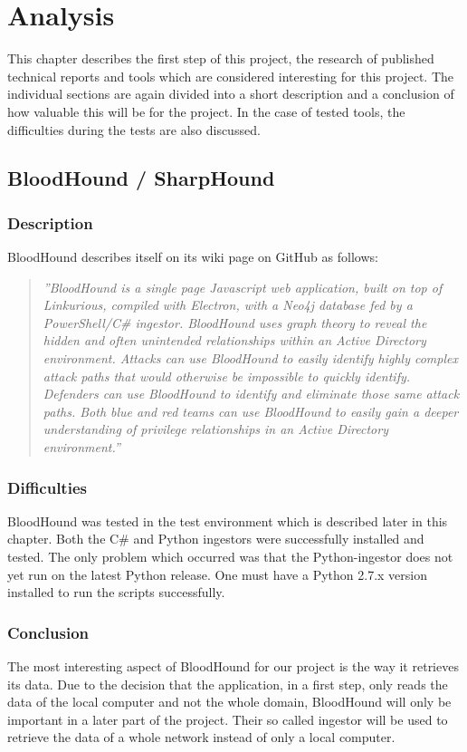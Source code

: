 \section{Analysis}
This chapter describes the first step of this project, the research of published technical reports and tools which are considered interesting for this project. The individual sections are again divided into a short description and a conclusion of how valuable this will be for the project. In the case of tested tools, the difficulties during the tests are also discussed.
\subsection{BloodHound / SharpHound}
\subsubsection{Description}
BloodHound describes itself on its wiki page on GitHub as follows:
\begin{quotation}
    \textit{''BloodHound is a single page Javascript web application, built on top of Linkurious, compiled with Electron, with a Neo4j database fed by a PowerShell/C\# ingestor. BloodHound uses graph theory to reveal the hidden and often unintended relationships within an Active Directory environment. Attacks can use BloodHound to easily identify highly complex attack paths that would otherwise be impossible to quickly identify. Defenders can use BloodHound to identify and eliminate those same attack paths. Both blue and red teams can use BloodHound to easily gain a deeper understanding of privilege relationships in an Active Directory environment.'' \cite{blo2018}} 
\end{quotation}
\subsubsection{Difficulties}
BloodHound was tested in the test environment which is described later in this chapter. Both the C\# and Python ingestors were successfully installed and tested. The only problem which occurred was that the Python-ingestor does not yet run on the latest Python release. One must have a Python 2.7.x version installed to run the scripts successfully.

\subsubsection{Conclusion}
The most interesting aspect of BloodHound for our project is the way it retrieves its data. Due to the decision that the application, in a first step, only reads the data of the local computer and not the whole domain, BloodHound will only be important in a later part of the project. Their so called ingestor will be used to retrieve the data of a whole network instead of only a local computer.

